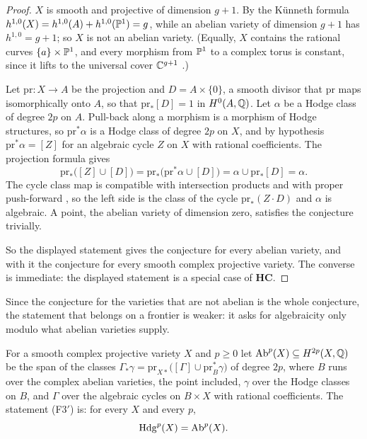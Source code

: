 \begin{proof}
$X$ is smooth and projective of dimension $g+1$. By the K\"unneth formula
$h^{1,0}(X)=h^{1,0}(A)+h^{1,0}(\mathbb{P}^{1})=g$, while an abelian variety of
dimension $g+1$ has $h^{1,0}=g+1$; so $X$ is not an abelian variety. (Equally,
$X$ contains the rational curves $\{a\}\times\mathbb{P}^{1}$, and every morphism
from $\mathbb{P}^{1}$ to a complex torus is constant, since it lifts to the
universal cover $\mathbb{C}^{g+1}$ \cite[Chapter~1]{BL04}.)

Let $\mathrm{pr}\colon X\to A$ be the projection and $D=A\times\{0\}$, a
smooth divisor that $\mathrm{pr}$ maps isomorphically onto $A$, so that
$\mathrm{pr}_{*}[D]=1$ in $H^{0}(A,\mathbb{Q})$. Let $\alpha$ be a Hodge class of
degree $2p$ on $A$. Pull-back along a morphism is a morphism of Hodge
structures, so $\mathrm{pr}^{*}\alpha$ is a Hodge class of degree $2p$ on
$X$, and by hypothesis $\mathrm{pr}^{*}\alpha=[Z]$ for an algebraic cycle
$Z$ on $X$ with rational coefficients. The projection formula gives
\[
  \mathrm{pr}_{*}\bigl([Z]\cup[D]\bigr)
  =\mathrm{pr}_{*}\bigl(\mathrm{pr}^{*}\alpha\cup[D]\bigr)
  =\alpha\cup\mathrm{pr}_{*}[D]=\alpha .
\]
The cycle class map is compatible with intersection products and with proper
push-forward \cite[Chapter~19]{Ful98}, so the left side
is the class of the cycle $\mathrm{pr}_{*}(Z\cdot D)$ and $\alpha$ is
algebraic. A point, the abelian variety of dimension zero, satisfies the
conjecture trivially.

So the displayed statement gives the conjecture for every abelian variety,
and with it the conjecture for every smooth complex projective variety. The
converse is immediate: the displayed statement is a special case of
$\mathbf{HC}$.
\end{proof}

Since the conjecture for the varieties that are not abelian is the whole
conjecture, the statement that belongs on a frontier is weaker: it asks for
algebraicity only modulo what abelian varieties supply.

\begin{definition}
\label{def:f3prime}
For a smooth complex projective variety $X$ and $p\ge0$ let
$\mathrm{Ab}^{p}(X)\subseteq H^{2p}(X,\mathbb{Q})$ be the span of the classes
$\Gamma_{*}\gamma=\mathrm{pr}_{X*}\bigl([\Gamma]\cup\mathrm{pr}_{B}^{*}\gamma\bigr)$
of degree $2p$, where $B$ runs over the complex abelian varieties, the point
included, $\gamma$ over the Hodge classes on $B$, and $\Gamma$ over the
algebraic cycles on $B\times X$ with rational coefficients. The statement
\textup{(F3$'$)} is: for every $X$ and every $p$,
\[
  \mathrm{Hdg}^{p}(X)=\mathrm{Ab}^{p}(X).
\]
\end{definition}

